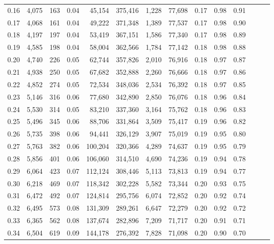\begin{tabular}{rrrrrrrrrrrrrr}
0.16 &  4,075 &    163 &  0.04 &   45,154 &  375,416 &   1,228 &  77,698 &  0.17 &  0.98 &      0.91 \\
0.17 &  4,068 &    161 &  0.04 &   49,222 &  371,348 &   1,389 &  77,537 &  0.17 &  0.98 &      0.90 \\
0.18 &  4,197 &    197 &  0.04 &   53,419 &  367,151 &   1,586 &  77,340 &  0.17 &  0.98 &      0.89 \\
0.19 &  4,585 &    198 &  0.04 &   58,004 &  362,566 &   1,784 &  77,142 &  0.18 &  0.98 &      0.88 \\
0.20 &  4,740 &    226 &  0.05 &   62,744 &  357,826 &   2,010 &  76,916 &  0.18 &  0.97 &      0.87 \\
0.21 &  4,938 &    250 &  0.05 &   67,682 &  352,888 &   2,260 &  76,666 &  0.18 &  0.97 &      0.86 \\
0.22 &  4,852 &    274 &  0.05 &   72,534 &  348,036 &   2,534 &  76,392 &  0.18 &  0.97 &      0.85 \\
0.23 &  5,146 &    316 &  0.06 &   77,680 &  342,890 &   2,850 &  76,076 &  0.18 &  0.96 &      0.84 \\
0.24 &  5,530 &    314 &  0.05 &   83,210 &  337,360 &   3,164 &  75,762 &  0.18 &  0.96 &      0.83 \\
0.25 &  5,496 &    345 &  0.06 &   88,706 &  331,864 &   3,509 &  75,417 &  0.19 &  0.96 &      0.82 \\
0.26 &  5,735 &    398 &  0.06 &   94,441 &  326,129 &   3,907 &  75,019 &  0.19 &  0.95 &      0.80 \\
0.27 &  5,763 &    382 &  0.06 &  100,204 &  320,366 &   4,289 &  74,637 &  0.19 &  0.95 &      0.79 \\
0.28 &  5,856 &    401 &  0.06 &  106,060 &  314,510 &   4,690 &  74,236 &  0.19 &  0.94 &      0.78 \\
0.29 &  6,064 &    423 &  0.07 &  112,124 &  308,446 &   5,113 &  73,813 &  0.19 &  0.94 &      0.77 \\
0.30 &  6,218 &    469 &  0.07 &  118,342 &  302,228 &   5,582 &  73,344 &  0.20 &  0.93 &      0.75 \\
0.31 &  6,472 &    492 &  0.07 &  124,814 &  295,756 &   6,074 &  72,852 &  0.20 &  0.92 &      0.74 \\
0.32 &  6,495 &    573 &  0.08 &  131,309 &  289,261 &   6,647 &  72,279 &  0.20 &  0.92 &      0.72 \\
0.33 &  6,365 &    562 &  0.08 &  137,674 &  282,896 &   7,209 &  71,717 &  0.20 &  0.91 &      0.71 \\
0.34 &  6,504 &    619 &  0.09 &  144,178 &  276,392 &   7,828 &  71,098 &  0.20 &  0.90 &      0.70 \\

\end{tabular}
